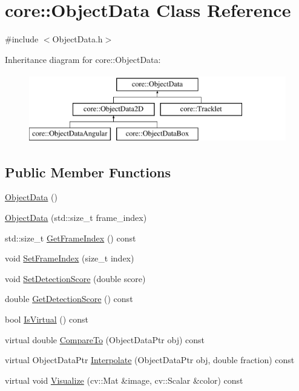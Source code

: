 \hypertarget{classcore_1_1ObjectData}{}\section{core\+:\+:Object\+Data Class Reference}
\label{classcore_1_1ObjectData}


{\ttfamily \#include $<$Object\+Data.\+h$>$}

Inheritance diagram for core\+:\+:Object\+Data\+:\begin{figure}[H]
\begin{center}
\leavevmode
\includegraphics[height=3.000000cm]{classcore_1_1ObjectData}
\end{center}
\end{figure}
\subsection*{Public Member Functions}
\begin{DoxyCompactItemize}
\item 
\hyperlink{classcore_1_1ObjectData_a7f47a396a3b9e8c12a1557c8156b8ff9}{Object\+Data} ()
\item 
\hyperlink{classcore_1_1ObjectData_af4333a52b012841a6ba73b25aeaae71b}{Object\+Data} (std\+::size\+\_\+t frame\+\_\+index)
\item 
std\+::size\+\_\+t \hyperlink{classcore_1_1ObjectData_a1151e9215baf315f4b98f696f4271162}{Get\+Frame\+Index} () const
\item 
void \hyperlink{classcore_1_1ObjectData_aedfe00fa37d5ac7ef554bda746931148}{Set\+Frame\+Index} (size\+\_\+t index)
\item 
void \hyperlink{classcore_1_1ObjectData_a737216c2689aefa216c1c842922d7dd8}{Set\+Detection\+Score} (double score)
\item 
double \hyperlink{classcore_1_1ObjectData_a227a11377867105d5fcbe9efc3faed45}{Get\+Detection\+Score} () const
\item 
bool \hyperlink{classcore_1_1ObjectData_a2880d710cfa520e9c0453e2a6729c0e2}{Is\+Virtual} () const
\item 
virtual double \hyperlink{classcore_1_1ObjectData_afbf7a1e87235f1b204d4d2eb8a37a9a6}{Compare\+To} (Object\+Data\+Ptr obj) const
\item 
virtual Object\+Data\+Ptr \hyperlink{classcore_1_1ObjectData_ad681915317decab76c384a635fc8444e}{Interpolate} (Object\+Data\+Ptr obj, double fraction) const
\item 
virtual void \hyperlink{classcore_1_1ObjectData_aae2c4fceddc529570dbe8909309f9961}{Visualize} (cv\+::\+Mat \&image, cv\+::\+Scalar \&color) const
\end{DoxyCompactItemize}
